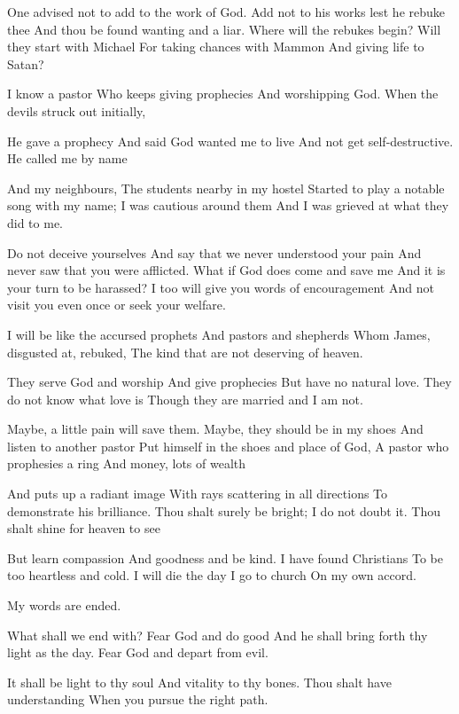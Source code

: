 \documentclass[
]{book}
\begin{document}
One advised not to add to the work of God.
Add not to his works lest he rebuke thee
And thou be found wanting and a liar.
Where will the rebukes begin?
Will they start with Michael
For taking chances with Mammon
And giving life to Satan?

I know a pastor
Who keeps giving prophecies
And worshipping God.
When the devils struck out initially,

He gave a prophecy
And said God wanted me to live
And not get self-destructive.
He called me by name

And my neighbours,
The students nearby in my hostel
Started to play a notable song with my name;
I was cautious around them
And I was grieved at what they did to me.

Do not deceive yourselves
And say that we never understood your pain
And never saw that you were afflicted.
What if God does come and save me
And it is your turn to be harassed?
I too will give you words of encouragement
And not visit you even once or seek your welfare.

I will be like the accursed prophets
And pastors and shepherds
Whom James, disgusted at, rebuked,
The kind that are not deserving of heaven.

They serve God and worship
And give prophecies
But have no natural love.
They do not know what love is
Though they are married and I am not.

Maybe, a little pain will save them.
Maybe, they should be in my shoes
And listen to another pastor
Put himself in the shoes and place of God,
A pastor who prophesies a ring
And money, lots of wealth

And puts up a radiant image
With rays scattering in all directions
To demonstrate his brilliance.
Thou shalt surely be bright;
I do not doubt it.
Thou shalt shine for heaven to see

But learn compassion
And goodness and be kind.
I have found Christians
To be too heartless and cold.
I will die the day I go to church
On my own accord.

My words are ended.

What shall we end with?
Fear God and do good
And he shall bring forth thy light as the day.
Fear God and depart from evil.

It shall be light to thy soul
And vitality to thy bones.
Thou shalt have understanding
When you pursue the right path.


\end{document}
